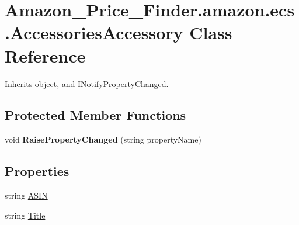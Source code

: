 \hypertarget{class_amazon___price___finder_1_1amazon_1_1ecs_1_1_accessories_accessory}{\section{Amazon\-\_\-\-Price\-\_\-\-Finder.\-amazon.\-ecs.\-Accessories\-Accessory Class Reference}
\label{class_amazon___price___finder_1_1amazon_1_1ecs_1_1_accessories_accessory}
}


 




Inherits object, and I\-Notify\-Property\-Changed.

\subsection*{Protected Member Functions}
\begin{DoxyCompactItemize}
\item 
\hypertarget{class_amazon___price___finder_1_1amazon_1_1ecs_1_1_accessories_accessory_ac40ebf3c187b9c7c335d801c14618be9}{void {\bfseries Raise\-Property\-Changed} (string property\-Name)}\label{class_amazon___price___finder_1_1amazon_1_1ecs_1_1_accessories_accessory_ac40ebf3c187b9c7c335d801c14618be9}

\end{DoxyCompactItemize}
\subsection*{Properties}
\begin{DoxyCompactItemize}
\item 
\hypertarget{class_amazon___price___finder_1_1amazon_1_1ecs_1_1_accessories_accessory_ac3cce4714ca41ba9e0785f226ecabbd3}{string \hyperlink{class_amazon___price___finder_1_1amazon_1_1ecs_1_1_accessories_accessory_ac3cce4714ca41ba9e0785f226ecabbd3}{A\-S\-I\-N}}\label{class_amazon___price___finder_1_1amazon_1_1ecs_1_1_accessories_accessory_ac3cce4714ca41ba9e0785f226ecabbd3}

\begin{DoxyCompactList}\small\item\em \end{DoxyCompactList}\item 
\hypertarget{class_amazon___price___finder_1_1amazon_1_1ecs_1_1_accessories_accessory_a10cb6df1dd7f083468a2af2e500d6c41}{string \hyperlink{class_amazon___price___finder_1_1amazon_1_1ecs_1_1_accessories_accessory_a10cb6df1dd7f083468a2af2e500d6c41}{Title}}\label{class_amazon___price___finder_1_1amazon_1_1ecs_1_1_accessories_accessory_a10cb6df1dd7f083468a2af2e500d6c41}

\begin{DoxyCompactList}\small\item\em \end{DoxyCompactList}\end{DoxyCompactItemize}
